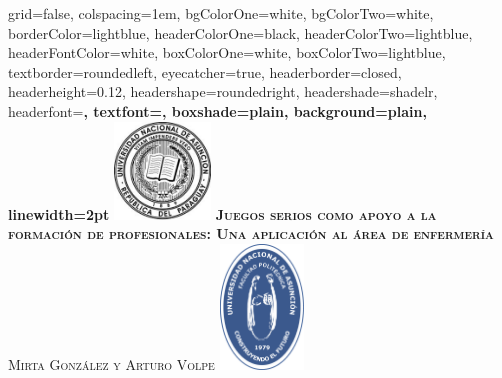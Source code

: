 \documentclass[portrait,final,a0paper,fontscale=0.277]{baposter}
\begin{document}
\begin{poster}%
  {
  grid=false,
  colspacing=1em,
  bgColorOne=white,
  bgColorTwo=white,
  borderColor=lightblue,
  headerColorOne=black,
  headerColorTwo=lightblue,
  headerFontColor=white,
  boxColorOne=white,
  boxColorTwo=lightblue,
  textborder=roundedleft,
  eyecatcher=true,
  headerborder=closed,
  headerheight=0.12\textheight,
  headershape=roundedright,
  headershade=shadelr,
  headerfont=\Large\bf\textsc, %
  textfont={\setlength{\parindent}{1.5em}},
  boxshade=plain,
  background=plain,
  linewidth=2pt
  }
  {\includegraphics[height=7em]{imagenes/logouna.png}} 
  {\bf\textsc{Juegos serios como apoyo a la formación de
          profesionales:\hspace{5cm} Una aplicación al área de enfermería}\vspace{0.5em}}
  {\textsc{Mirta González y Arturo Volpe}}
  {%
    \includegraphics[height=9em]{../util/logo.pdf}
  }

    \newcommand{\colouredcircle}{%
      \tikz{\useasboundingbox (-0.2em,-0.32em) rectangle(0.2em,0.32em);
          \draw[draw=black,fill=lightblue,line width=0.03em] (0,0) circle(0.18em);}\-\ }


\end{poster}
\end{document}
